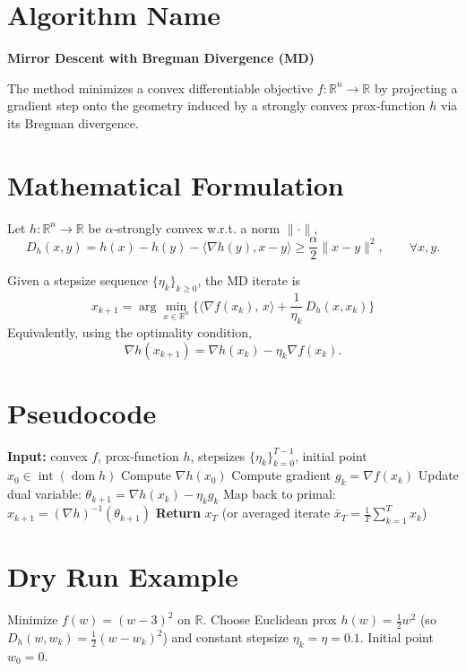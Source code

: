 \documentclass{article}
\newcommand{\Breg}{D_h}
\newcommand{\R}{\mathbb{R}}
\begin{document}
\section*{Algorithm Name}
\textbf{Mirror Descent with Bregman Divergence (MD)}  

The method minimizes a convex differentiable objective $f:\R^n\to\R$ by projecting a gradient step onto the geometry induced by a strongly convex prox‑function $h$ via its Bregman divergence.

\section*{Mathematical Formulation}
Let $h:\R^n\rightarrow\R$ be $\alpha$‑strongly convex w.r.t. a norm $\|\cdot\|$,
\[
\Breg(x,y)=h(x)-h(y)-\langle\nabla h(y),x-y\rangle\ge \frac{\alpha}{2}\|x-y\|^{2},\qquad\forall x,y.
\]

Given a stepsize sequence $\{\eta_k\}_{k\ge0}$, the MD iterate is
\begin{equation}
\boxed{
x_{k+1}= \arg\min_{x\in\R^{n}}\Big\{ \langle \nabla f(x_k),\,x\rangle
      +\frac{1}{\eta_k}\,\Breg(x,x_k) \Big\}
}
\label{eq:md-update}
\end{equation}
Equivalently, using the optimality condition,
\[
\nabla h(x_{k+1}) = \nabla h(x_k)-\eta_k \nabla f(x_k).
\tag{1}
\]

\section*{Pseudocode}
\begin{algorithm}[H]
\caption{Mirror Descent (MD)}
\begin{algorithmic}[1]
\State \textbf{Input:} convex $f$, prox‑function $h$, stepsizes $\{\eta_k\}_{k=0}^{T-1}$, initial point $x_0\in\operatorname{int}(\operatorname{dom}h)$
\State Compute $\nabla h(x_0)$
    \State Compute gradient $g_k=\nabla f(x_k)$
    \State Update dual variable: $\theta_{k+1}= \nabla h(x_k)-\eta_k g_k$
    \State Map back to primal: $x_{k+1}= (\nabla h)^{-1}(\theta_{k+1})$
\EndFor
\State \textbf{Return} $x_T$ (or averaged iterate $\bar x_T=\frac1T\sum_{k=1}^{T}x_k$)
\end{algorithmic}
\end{algorithm}

\section*{Dry Run Example}
Minimize $f(w)=(w-3)^2$ on $\R$. Choose Euclidean prox $h(w)=\frac12 w^2$ (so $\Breg(w,w_k)=\frac12 (w-w_k)^2$) and constant stepsize $\eta_k=\eta=0.1$.  
Initial point $w_0=0$.
\end{document}
